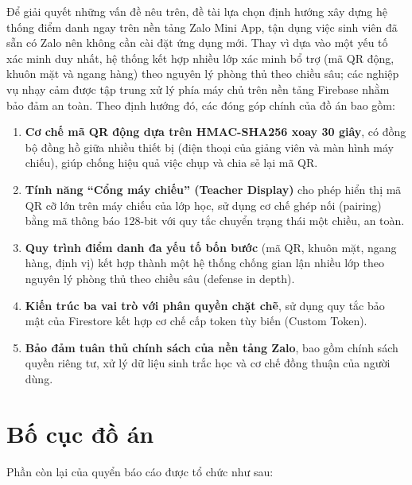\documentclass[../main.tex]{subfiles}
\begin{document}
Để giải quyết những vấn đề nêu trên, đề tài lựa chọn định hướng xây dựng hệ thống điểm danh
ngay trên nền tảng Zalo Mini App, tận dụng việc sinh viên đã sẵn có Zalo nên không cần cài
đặt ứng dụng mới. Thay vì dựa vào một yếu tố xác minh duy nhất, hệ thống kết hợp nhiều lớp
xác minh bổ trợ (mã QR động, khuôn mặt và ngang hàng) theo nguyên lý phòng thủ theo chiều
sâu; các nghiệp vụ nhạy cảm được tập trung xử lý phía máy chủ trên nền tảng Firebase nhằm
bảo đảm an toàn. Theo định hướng đó, các đóng góp chính của đồ án bao gồm:

\begin{enumerate}[leftmargin=1.5em]
  \item \textbf{Cơ chế mã QR động dựa trên HMAC-SHA256 xoay 30 giây}, có đồng bộ đồng
  hồ giữa nhiều thiết bị (điện thoại của giảng viên và màn hình máy chiếu), giúp chống
  hiệu quả việc chụp và chia sẻ lại mã QR.

  \item \textbf{Tính năng ``Cổng máy chiếu'' (Teacher Display)} cho phép hiển thị mã QR
  cỡ lớn trên máy chiếu của lớp học, sử dụng cơ chế ghép nối (pairing) bằng mã thông báo
  128-bit với quy tắc chuyển trạng thái một chiều, an toàn.

  \item \textbf{Quy trình điểm danh đa yếu tố bốn bước} (mã QR, khuôn mặt, ngang hàng,
  định vị) kết hợp thành một hệ thống chống gian lận nhiều lớp theo nguyên lý phòng thủ
  theo chiều sâu (defense in depth).

  \item \textbf{Kiến trúc ba vai trò với phân quyền chặt chẽ}, sử dụng quy tắc bảo mật
  của Firestore kết hợp cơ chế cấp token tùy biến (Custom Token).

  \item \textbf{Bảo đảm tuân thủ chính sách của nền tảng Zalo}, bao gồm chính sách quyền
  riêng tư, xử lý dữ liệu sinh trắc học và cơ chế đồng thuận của người dùng.
\end{enumerate}

\section{Bố cục đồ án}
\label{sec:bo-cuc}

Phần còn lại của quyển báo cáo được tổ chức như sau:
\end{document}
